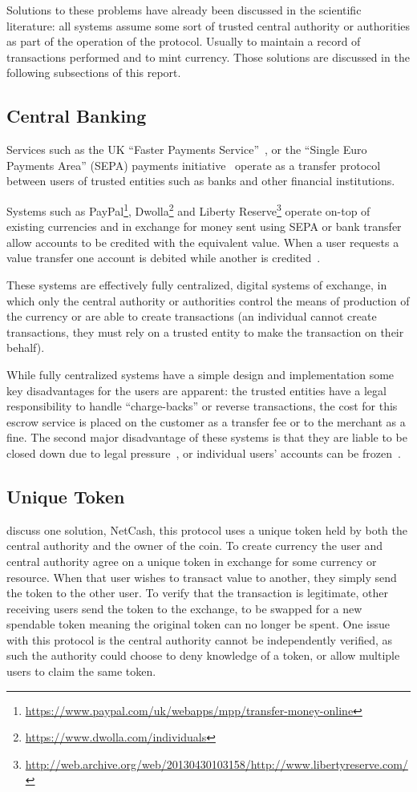 Solutions to these problems have already been discussed in the scientific literature: all systems assume some sort of trusted central authority or authorities as part of the operation of the protocol. Usually to maintain a record of transactions performed and to mint currency.  Those solutions are discussed in the following subsections of this report.


\subsection{Central Banking}
Services such as the UK ``Faster Payments Service''~\cite{guardian-fps}, or the ``Single Euro Payments Area'' (SEPA) payments initiative~\cite{SEPA} operate as a transfer protocol between users of trusted entities such as banks and other financial institutions.


Systems such as PayPal\footnote{\url{https://www.paypal.com/uk/webapps/mpp/transfer-money-online}}, Dwolla\footnote{\url{https://www.dwolla.com/individuals}} and Liberty Reserve\footnote{\url{http://web.archive.org/web/20130430103158/http://www.libertyreserve.com/}} operate on-top of existing currencies and in exchange for money sent using SEPA or bank transfer allow accounts to be credited with the equivalent value.  When a user requests a value transfer one account is debited while another is credited~\cite{paypal}.


These systems are effectively fully centralized, digital systems of exchange, in which only the central authority or authorities control the means of production of the currency or are able to create transactions (an individual cannot create transactions, they must rely on a trusted entity to make the transaction on their behalf).


While fully centralized systems have a simple design and implementation some key disadvantages for the users are apparent: the trusted entities have a legal responsibility to handle ``charge-backs'' or reverse transactions, the cost for this escrow service is placed on the customer as a transfer fee or to the merchant as a fine. The second major disadvantage of these systems is that they are liable to be closed down due to legal pressure~\cite{lr-shutdown}, or individual users' accounts can be frozen~\cite{mtgox-dwolla,vlad:mtgox-dwolla}.


\subsection{Unique Token} \textcite{netcash} discuss one solution, NetCash, this protocol uses a unique token held by both the central authority and the owner of the coin. To create currency the user and central authority agree on a unique token in exchange for some currency or resource. When that user wishes to transact value to another, they simply send the token to the other user.  To verify that the transaction is legitimate, other receiving users send the token to the exchange, to be swapped for a new spendable token meaning the original token can no longer be spent. One issue with this protocol is the central authority cannot be independently verified, as such the authority could choose to deny knowledge of
a token, or allow multiple users to claim the same token.


